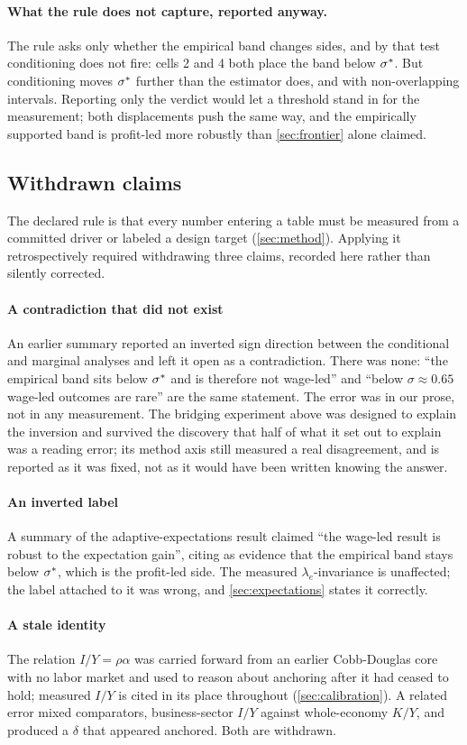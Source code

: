 \paragraph{What the rule does not capture, reported anyway.} The rule asks only
whether the empirical band changes sides, and by that test conditioning
does not fire: cells 2 and 4 both place the band below $\sigma^{\ast}$. But
conditioning moves $\sigma^{\ast}$ further than the estimator does, and with
non-overlapping intervals. Reporting only the verdict would let a threshold
stand in for the measurement; both displacements push the same way, and the
empirically supported band is profit-led more robustly than \cref{sec:frontier}
alone claimed.

\subsection{Withdrawn claims}
\label{app:retractions}

The declared rule is that every number entering a table must be
measured from a committed driver or labeled a design target
(\cref{sec:method}). Applying it retrospectively required withdrawing three
claims, recorded here rather than silently corrected.

\paragraph{A contradiction that did not exist} An earlier summary
reported an inverted sign direction between the conditional and
marginal analyses and left it open as a contradiction. There was none: ``the
empirical band sits below $\sigma^{\ast}$ and is therefore not wage-led'' and
``below $\sigma \approx 0.65$ wage-led outcomes are rare'' are the same
statement. The error was in our prose, not in any measurement. The bridging
experiment above was designed to explain the inversion and survived the
discovery that half of what it set out to explain was a reading error; its
method axis still measured a real disagreement, and is reported as it was
fixed, not as it would have been written knowing the answer.
\paragraph{An inverted label} A summary of the adaptive-expectations
result claimed ``the wage-led result is robust to the expectation gain'',
citing as evidence that the empirical band stays below $\sigma^{\ast}$, which is
the profit-led side. The measured $\lambda_e$-invariance is unaffected; the
label attached to it was wrong, and \cref{sec:expectations} states it
correctly. \paragraph{A stale identity} The relation $I/Y = \rho\alpha$ was
carried forward from an earlier Cobb-Douglas core with no labor market and
used to reason about anchoring after it had ceased to hold; measured $I/Y$ is
cited in its place throughout (\cref{sec:calibration}). A related error mixed
comparators, business-sector $I/Y$ against whole-economy $K/Y$, and produced a
$\delta$ that appeared anchored. Both are withdrawn.

